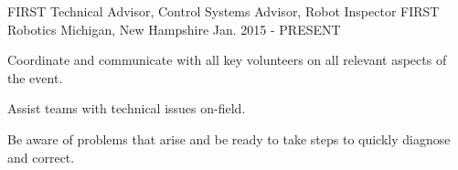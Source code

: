 
\begin{cventries}

  \cventry
    {FIRST Technical Advisor, Control Systems Advisor, Robot Inspector} %
    {FIRST Robotics} %
    {Michigan, New Hampshire} %
    {Jan. 2015 - PRESENT} %
    {
      \begin{cvitems} %
        \item {Coordinate and communicate with all key volunteers on all relevant aspects of the event.}
        \item {Assist teams with technical issues on-field.}
        \item {Be aware of problems that arise and be ready to take steps to quickly diagnose and correct.}
      \end{cvitems}
    }



\end{cventries}
